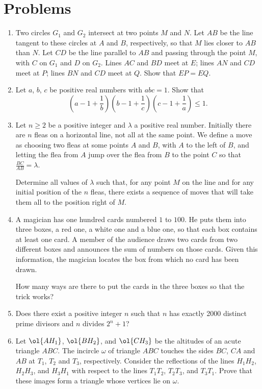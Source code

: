 \documentclass[11pt]{scrartcl}
\begin{document}
\section{Problems}
\begin{enumerate}[\bfseries 1.]
\item %
Two circles $G_1$ and $G_2$ intersect at two points $M$ and $N$.
Let $AB$ be the line tangent to these circles at $A$ and $B$,
respectively, so that $M$ lies closer to $AB$ than $N$.
Let $CD$ be the line parallel to $AB$
and passing through the point $M$,
with $C$ on $G_1$ and $D$ on $G_2$.
Lines $AC$ and $BD$ meet at $E$; lines $AN$ and $CD$ meet at $P$;
lines $BN$ and $CD$ meet at $Q$.
Show that $EP = EQ$.

\item %
Let $a$, $b$, $c$ be positive real numbers with $abc = 1$.
Show that
\[
  \left( a - 1 + \frac 1b \right)
  \left( b - 1 + \frac 1c \right)
  \left( c - 1 + \frac 1a \right)
  \le 1.
\]

\item %
Let $n \ge 2$ be a positive integer
and $\lambda$ a positive real number.
Initially there are $n$ fleas on a horizontal line,
not all at the same point.
We define a move as choosing two fleas at some points $A$ and $B$,
with $A$ to the left of $B$,
and letting the flea from $A$ jump over the flea from $B$ to the point $C$
so that $\frac{BC}{AB} = \lambda$.

Determine all values of $ \lambda$ such that,
for any point $M$ on the line
and for any initial position of the $n$ fleas,
there exists a sequence of moves that will take
them all to the position right of $M$.

\item %
A magician has one hundred cards numbered $1$ to $100$.
He puts them into three boxes, a red one, a white one and a blue one,
so that each box contains at least one card.
A member of the audience draws two cards from two different boxes
and announces the sum of numbers on those cards.
Given this information,
the magician locates the box from which no card has been drawn.

How many ways are there to put the cards
in the three boxes so that the trick works?

\item %
Does there exist a positive integer $n$
such that $n$ has exactly 2000 distinct prime divisors
and $n$ divides $2^n + 1$?

\item %
Let $\ol{AH_1}$, $\ol{BH_2}$, and $\ol{CH_3}$ be the
altitudes of an acute triangle $ABC$.
The incircle $\omega$ of triangle $ABC$ touches the sides
$BC$, $CA$ and $AB$ at $T_1$, $T_2$ and $T_3$, respectively.
Consider the reflections of the lines $H_1H_2$, $H_2H_3$, and
$H_3H_1$ with respect to the lines $T_1T_2$, $T_2T_3$, and $T_3T_1$.
Prove that these images form a triangle whose vertices lie on $\omega$.

\end{enumerate}
\pagebreak
\end{document}
